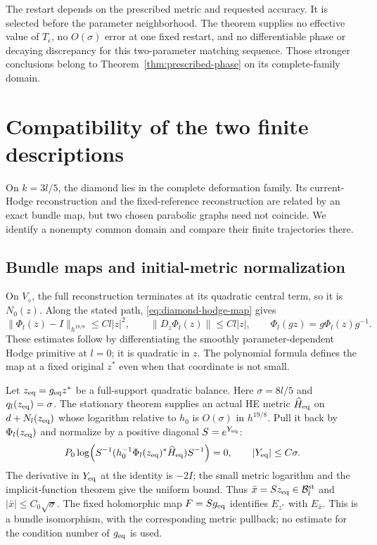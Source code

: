 \documentclass[11pt]{amsart}
\theoremstyle{definition}
\theoremstyle{remark}
\begin{document}
The restart depends on the prescribed metric and requested
accuracy. It is selected before the parameter neighborhood.
The theorem supplies no effective value of $T_\epsilon$, no
$O(\sigma)$ error at one fixed restart, and no differentiable
phase or decaying discrepancy for this two-parameter matching
sequence. Those stronger conclusions belong to
Theorem~\ref{thm:prescribed-phase} on its complete-family domain.

\section{Compatibility of the two finite descriptions}\label{sec:compatibility}

On $k=3l/5$, the diamond lies in the complete deformation family.
Its current-Hodge reconstruction and the fixed-reference
reconstruction are related by an exact bundle map, but two chosen
parabolic graphs need not coincide. We identify a nonempty common
domain and compare their finite trajectories there.

\subsection{Bundle maps and initial-metric normalization}
On $V_\diamond$, the full reconstruction terminates at its
quadratic central term, so it is $N_0(z)$. Along the stated path,
\eqref{eq:diamond-hodge-map} gives
\begin{equation}\label{eq:compat-hodge-bounds}
 \|\Phi_l(z)-I\|_{h^{19/8}}\le Cl|z|^2,\qquad
 \|D_z\Phi_l(z)\|\le Cl|z|,\qquad
 \Phi_l(gz)=g\Phi_l(z)g^{-1}.
\end{equation}
These estimates follow by differentiating the smoothly
parameter-dependent Hodge primitive at $l=0$; it is quadratic
in $z$. The polynomial formula defines the map at a fixed
original $z^*$ even when that coordinate is not small.

Let $z_{\rm eq}=g_{\rm eq}z^*$ be a full-support quadratic
balance. Here $\sigma=8l/5$ and $q_l(z_{\rm eq})=\sigma$.
The stationary theorem supplies an actual HE metric
$\widehat H_{\rm eq}$ on $d+N_l(z_{\rm eq})$ whose logarithm
relative to $h_0$ is $O(\sigma)$ in $h^{19/8}$.
Pull it back by $\Phi_l(z_{\rm eq})$ and normalize by a positive
diagonal $S=e^{Y_{\rm eq}}$:
\begin{equation}\label{eq:compat-balance}
 P_0\log\!\left(S^{-1}
        (h_0^{-1}\Phi_l(z_{\rm eq})^*\widehat H_{\rm eq})
                         S^{-1}\right)=0,\qquad
 |Y_{\rm eq}|\le C\sigma .
\end{equation}
The derivative in $Y_{\rm eq}$ at the identity is $-2I$;
the small metric logarithm and the implicit-function theorem
give the uniform bound. Thus
$\bar x=Sz_{\rm eq}\in\mathcal B_l^{\rm st}$ and
$|\bar x|\le C_0\sqrt\sigma$. The fixed holomorphic map
$F=Sg_{\rm eq}$ identifies $E_{z^*}$ with $E_{\bar x}$.
This is a bundle isomorphism, with the corresponding metric
pullback; no estimate for the condition number of $g_{\rm eq}$
is used.
\end{document}
